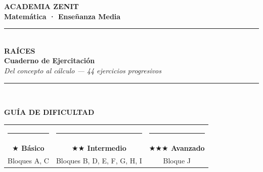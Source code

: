 \documentclass[11pt, letterpaper]{article}
\begin{document}

\thispagestyle{empty}
\vspace*{1.4cm}

\begin{center}
  {\Huge\bfseries\color{zenitnavy} ACADEMIA ZENIT}\\[0.5cm]
  {\large\bfseries\color{zenitblue} Matemática · Enseñanza Media}\\[0.9cm]
  \textcolor{zenitnavy}{\rule{0.74\linewidth}{1.8pt}}\\[0.7cm]
  {\fontsize{38}{44}\selectfont\bfseries\color{zenitnavy} RAÍCES}\\[0.3cm]
  {\LARGE\bfseries\color{zenitblue} Cuaderno de Ejercitación}\\[0.25cm]
  {\large\color{zenitgold}\textit{Del concepto al cálculo — 44 ejercicios progresivos}}\\[0.7cm]
  \textcolor{zenitnavy}{\rule{0.74\linewidth}{1.8pt}}\\[1.0cm]
\end{center}

\begin{center}
\begin{tcolorbox}[enhanced, width=0.80\linewidth,
  colback=white, colframe=zenitnavy,
  arc=6pt, left=18pt, right=18pt, top=12pt, bottom=12pt]
\begin{center}
{\small\bfseries\color{zenitnavy} GUÍA DE DIFICULTAD}\\[10pt]
\begin{tabular}{ccc}
\textcolor{blockb}{\rule{2.6cm}{4.5pt}} &
\textcolor{zenitgold}{\rule{2.6cm}{4.5pt}} &
\textcolor{zenitred}{\rule{2.6cm}{4.5pt}}\\[5pt]
\textcolor{blockb}{\textbf{$\bigstar$ Básico}} &
\textcolor{zenitgold}{\textbf{$\bigstar\bigstar$ Intermedio}} &
\textcolor{zenitred}{\textbf{$\bigstar\bigstar\bigstar$ Avanzado}}\\[2pt]
\small\textcolor{blockb}{Bloques A, C} &
\small\textcolor{zenitgold}{Bloques B, D, E, F, G, H, I} &
\small\textcolor{zenitred}{Bloque J}\\
\end{tabular}
\end{center}
\end{tcolorbox}
\end{center}
\end{document}

